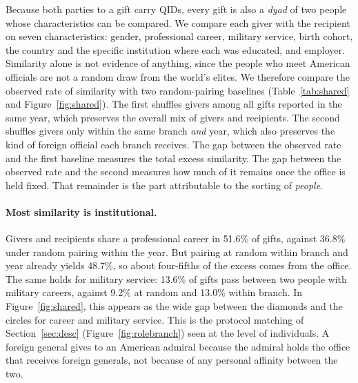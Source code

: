 \documentclass[11pt]{article}
\begin{document}
Because both parties to a gift carry QIDs, every gift is also a \emph{dyad} of two people whose characteristics can be compared. We compare each giver with the recipient on seven characteristics: gender, professional career, military service, birth cohort, the country and the specific institution where each was educated, and employer. Similarity alone is not evidence of anything, since the people who meet American officials are not a random draw from the world's elites. We therefore compare the observed rate of similarity with two random-pairing baselines (Table~\ref{tab:shared} and Figure~\ref{fig:shared}). The first shuffles givers among all gifts reported in the same year, which preserves the overall mix of givers and recipients. The second shuffles givers only within the same branch \emph{and} year, which also preserves the kind of foreign official each branch receives. The gap between the observed rate and the first baseline measures the total excess similarity. The gap between the observed rate and the second measures how much of it remains once the office is held fixed. That remainder is the part attributable to the sorting of \emph{people}.

\paragraph{Most similarity is institutional.} Givers and recipients share a professional career in 51.6\% of gifts, against 36.8\% under random pairing within the year. But pairing at random within branch and year already yields 48.7\%, so about four-fifths of the excess comes from the office. The same holds for military service: 13.6\% of gifts pass between two people with military careers, against 9.2\% at random and 13.0\% within branch. In Figure~\ref{fig:shared}, this appears as the wide gap between the diamonds and the circles for career and military service. This is the protocol matching of Section~\ref{sec:desc} (Figure~\ref{fig:rolebranch}) seen at the level of individuals. A foreign general gives to an American admiral because the admiral holds the office that receives foreign generals, not because of any personal affinity between the two.
\end{document}

